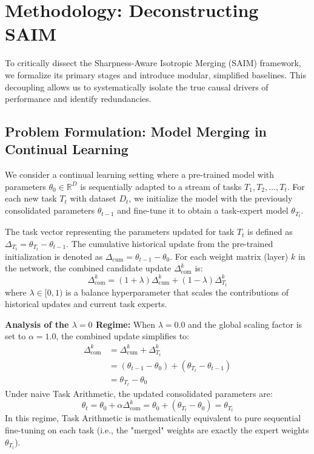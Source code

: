 \section{Methodology: Deconstructing SAIM}
\label{sec:method}

To critically dissect the Sharpness-Aware Isotropic Merging (SAIM) framework, we formalize its primary stages and introduce modular, simplified baselines. This decoupling allows us to systematically isolate the true causal drivers of performance and identify redundancies.

\subsection{Problem Formulation: Model Merging in Continual Learning}
We consider a continual learning setting where a pre-trained model with parameters $\theta_0 \in \mathbb{R}^D$ is sequentially adapted to a stream of tasks $T_1, T_2, \dots, T_t$. For each new task $T_t$ with dataset $D_t$, we initialize the model with the previously consolidated parameters $\theta_{t-1}$ and fine-tune it to obtain a task-expert model $\theta_{T_t}$. 

The task vector representing the parameters updated for task $T_t$ is defined as $\Delta_{T_t} = \theta_{T_t} - \theta_{t-1}$. The cumulative historical update from the pre-trained initialization is denoted as $\Delta_{\text{cum}} = \theta_{t-1} - \theta_0$. For each weight matrix (layer) $k$ in the network, the combined candidate update $\Delta^k_{\text{com}}$ is:
\begin{equation}
  \Delta^k_{\text{com}} = (1+\lambda)\Delta^k_{\text{cum}} + (1-\lambda)\Delta^k_{T_t}
\end{equation}
where $\lambda \in [0, 1)$ is a balance hyperparameter that scales the contributions of historical updates and current task experts.

\textbf{Analysis of the $\lambda = 0$ Regime:} When $\lambda = 0.0$ and the global scaling factor is set to $\alpha = 1.0$, the combined update simplifies to:
\begin{align}
  \Delta^k_{\text{com}} &= \Delta^k_{\text{cum}} + \Delta^k_{T_t} \nonumber\\
  &= (\theta_{t-1} - \theta_0) + (\theta_{T_t} - \theta_{t-1}) \nonumber\\
  &= \theta_{T_t} - \theta_0
\end{align}
Under naive Task Arithmetic, the updated consolidated parameters are:
\begin{equation}
  \theta_t = \theta_0 + \alpha \Delta^k_{\text{com}} = \theta_0 + (\theta_{T_t} - \theta_0) = \theta_{T_t}
\end{equation}
In this regime, Task Arithmetic is mathematically equivalent to pure sequential fine-tuning on each task (i.e., the "merged" weights are exactly the expert weights $\theta_{T_t}$).

